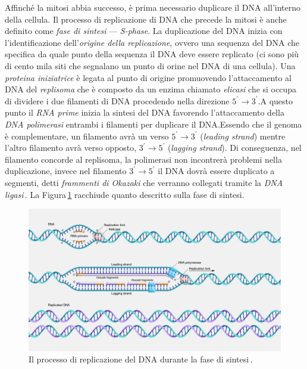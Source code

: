 Affinché la mitosi abbia successo, è prima necessario duplicare il \acs{DNA} all'interno della cellula. Il processo di replicazione di \acs{DNA} che precede la mitosi è anche definito come \textsl{fase di sintesi} — \textit{S-phase}. La duplicazione del \acs{DNA} inizia con l'identificazione dell'\textsl{origine della replicazione}, ovvero una sequenza del \acs{DNA} che specifica da quale punto della sequenza il \acs{DNA} deve essere replicato (ci sono più di cento mila siti che segnalano un punto di orine nel \acs{DNA} di una cellula). Una \textsl{proteina iniziatrice} è legata al punto di origine promuovendo l'attaccamento al \acs{DNA} del \textsl{replisoma} che è composto da un enzima chiamato \textsl{elicasi} che si occupa di dividere i due filamenti di \acs{DNA} procedendo nella direzione $5^\prime \to 3^\prime$.\@ A questo punto il \textsl{\acs{RNA} prime} inizia la sintesi del \acs{DNA} favorendo l'attaccamento della \textsl{\acs{DNA} polimerasi} entrambi i filamenti per duplicare il \acs{DNA}.\@ Essendo che il genoma è complementare, un filamento avrà un verso $5^\prime \to 3^\prime$ (\textit{leading strand}) mentre l'altro filamento avrà verso opposto, $3^\prime \to 5^\prime$ (\textit{lagging strand}). Di conseguenza, nel filamento concorde al replisoma, la polimerasi non incontrerà problemi nella duplicazione, invece nel filamento $3^\prime \to 5^\prime$ il \acs{DNA} dovrà essere duplicato a segmenti, detti \textsl{frammenti di Okazaki} che verranno collegati tramite la \textsl{\acs{DNA} ligasi}\,\cite{laskey1989s, bell2002dna, dutta1997initiation, 2017727}. La Figura\,\ref{fig:dna-replication} racchiude quanto descritto sulla fase di sintesi.

\begin{figure}[b!]
    \centering
    \includegraphics[width=\textwidth]{assets/imgs/dna-replication.jpg}
    \caption[Il processo di replicazione del \acs{DNA}.]{Il processo di replicazione del \acs{DNA} durante la fase di sintesi\,\cite{nhgri_dna_replication_image}.}\label{fig:dna-replication}
\end{figure}

